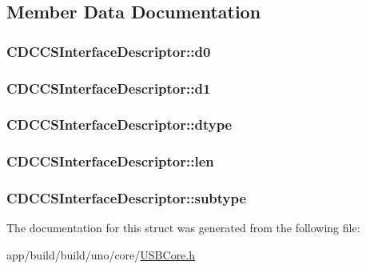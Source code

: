 \subsection{Member Data Documentation}
\hypertarget{struct_c_d_c_c_s_interface_descriptor_a8354e45c15df0e06cc72b35d6cea23f5}{
\subsubsection[{d0}]{ C\-D\-C\-C\-S\-Interface\-Descriptor\-::d0}}\label{struct_c_d_c_c_s_interface_descriptor_a8354e45c15df0e06cc72b35d6cea23f5}
\hypertarget{struct_c_d_c_c_s_interface_descriptor_a1c4fa9ab196fe4731d541f8abcefa36a}{
\subsubsection[{d1}]{ C\-D\-C\-C\-S\-Interface\-Descriptor\-::d1}}\label{struct_c_d_c_c_s_interface_descriptor_a1c4fa9ab196fe4731d541f8abcefa36a}
\hypertarget{struct_c_d_c_c_s_interface_descriptor_a40eb77b74991465abcdbf3cfda5cb4fc}{
\subsubsection[{dtype}]{ C\-D\-C\-C\-S\-Interface\-Descriptor\-::dtype}}\label{struct_c_d_c_c_s_interface_descriptor_a40eb77b74991465abcdbf3cfda5cb4fc}
\hypertarget{struct_c_d_c_c_s_interface_descriptor_a4898e456596cc2351587e6f8313f0135}{
\subsubsection[{len}]{ C\-D\-C\-C\-S\-Interface\-Descriptor\-::len}}\label{struct_c_d_c_c_s_interface_descriptor_a4898e456596cc2351587e6f8313f0135}
\hypertarget{struct_c_d_c_c_s_interface_descriptor_a9ba536afa860b01eff6b0da6f31a5445}{
\subsubsection[{subtype}]{ C\-D\-C\-C\-S\-Interface\-Descriptor\-::subtype}}\label{struct_c_d_c_c_s_interface_descriptor_a9ba536afa860b01eff6b0da6f31a5445}


The documentation for this struct was generated from the following file\-:\begin{DoxyCompactItemize}
\item 
app/build/build/uno/core/\hyperlink{_u_s_b_core_8h}{U\-S\-B\-Core.\-h}\end{DoxyCompactItemize}
